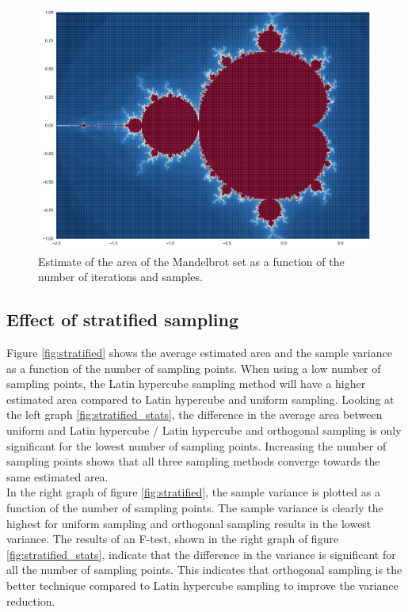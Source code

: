 \documentclass{uva-inf-article}
\begin{document}
\begin{figure}[h]
    \centering
   \includegraphics[width=.85\textwidth]{fractal.pdf}
    \caption{Estimate of the area of the Mandelbrot set as a function of the number of iterations and samples.}
    \label{fig:var_i_s}
\end{figure}

\subsection{Effect of stratified sampling}

Figure \ref{fig:stratified} shows the average estimated area and the sample variance as a function of the number of sampling points.
When using a low number of sampling points, the Latin hypercube sampling method will have a higher estimated area compared to Latin hypercube and uniform sampling. Looking at the left graph \ref{fig:stratified_stats}, the difference in the average area between uniform and Latin hypercube / Latin hypercube and orthogonal sampling is only significant for the lowest number of sampling points.
Increasing the number of sampling points shows that all three sampling methods converge towards the same estimated area.\\

In the right graph of figure \ref{fig:stratified}, the sample variance is plotted as a function of the number of sampling points. The sample variance is clearly the highest for uniform sampling and orthogonal sampling results in the lowest variance. The results of an F-test, shown in the right graph of figure \ref{fig:stratified_stats}, indicate that the difference in the variance is significant for all the number of sampling points.
This indicates that orthogonal sampling is the better technique compared to Latin hypercube sampling to improve the variance reduction.
\end{document}
